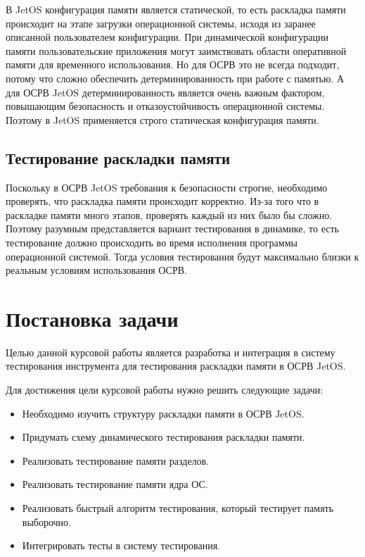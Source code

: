 \documentclass[oneside,senior,etd]{BYUPhys}
\begin{document}
В JetOS конфигурация памяти является статической, то есть раскладка памяти происходит
на этапе загрузки операционной системы, исходя из заранее описанной пользователем
конфигурации. При динамической конфигурации памяти пользовательские приложения могут
заимствовать области оперативной памяти для временного использования. Но для ОСРВ
это не всегда подходит, потому что сложно обеспечить детерминированность при работе
с памятью. А для ОСРВ JetOS детерминированность является очень важным фактором,
повышающим безопасность и отказоустойчивость операционной системы. Поэтому в JetOS
применяется строго статическая конфигурация памяти.

\subsection{Тестирование раскладки памяти}

Поскольку в ОСРВ JetOS требования к безопасности строгие, необходимо проверять,
что раскладка памяти происходит корректно. Из-за того что в раскладке памяти много
этапов, проверять каждый из них было бы сложно. Поэтому разумным представляется вариант
тестирования в динамике, то есть тестирование должно происходить во время исполнения
программы операционной системой. Тогда условия тестирования будут максимально близки
к реальным условиям использования ОСРВ.

\section{Постановка задачи}

Целью данной курсовой работы является разработка и интеграция в систему тестирования
инструмента для тестирования раскладки памяти в ОСРВ JetOS.

Для достижения цели курсовой работы нужно решить следующие задачи:
\begin{itemize}
  \item Необходимо изучить структуру раскладки памяти в ОСРВ JetOS.
  \item Придумать схему динамического тестирования раскладки памяти.
  \item Реализовать тестирование памяти разделов.
  \item Реализовать тестирование памяти ядра ОС.
  \item Реализовать быстрый алгоритм тестирования, который тестирует память выборочно.
  \item Интегрировать тесты в систему тестирования.
\end{itemize}
\end{document}
